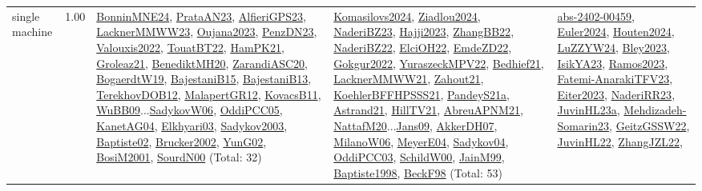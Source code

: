 {\begin{longtable}{p{3cm}r>{\raggedright\arraybackslash}p{6cm}>{\raggedright\arraybackslash}p{6cm}>{\raggedright\arraybackslash}p{8cm}}
\index{single machine}\index{Classification!single machine}single machine &  1.00 & \hyperref[detail:BonninMNE24]{BonninMNE24}, \hyperref[detail:PrataAN23]{PrataAN23}, \hyperref[detail:AlfieriGPS23]{AlfieriGPS23}, \hyperref[detail:LacknerMMWW23]{LacknerMMWW23}, \hyperref[detail:Oujana2023]{Oujana2023}, \hyperref[detail:PenzDN23]{PenzDN23}, \hyperref[detail:Valouxis2022]{Valouxis2022}, \hyperref[detail:TouatBT22]{TouatBT22}, \hyperref[detail:HamPK21]{HamPK21}, \hyperref[detail:Groleaz21]{Groleaz21}, \hyperref[detail:BenediktMH20]{BenediktMH20}, \hyperref[detail:ZarandiASC20]{ZarandiASC20}, \hyperref[detail:BogaerdtW19]{BogaerdtW19}, \hyperref[detail:BajestaniB15]{BajestaniB15}, \hyperref[detail:BajestaniB13]{BajestaniB13}, \hyperref[detail:TerekhovDOB12]{TerekhovDOB12}, \hyperref[detail:MalapertGR12]{MalapertGR12}, \hyperref[detail:KovacsB11]{KovacsB11}, \hyperref[detail:WuBB09]{WuBB09}...\hyperref[detail:SadykovW06]{SadykovW06}, \hyperref[detail:OddiPCC05]{OddiPCC05}, \hyperref[detail:KanetAG04]{KanetAG04}, \hyperref[detail:Elkhyari03]{Elkhyari03}, \hyperref[detail:Sadykov2003]{Sadykov2003}, \hyperref[detail:Baptiste02]{Baptiste02}, \hyperref[detail:Brucker2002]{Brucker2002}, \hyperref[detail:YunG02]{YunG02}, \hyperref[detail:BosiM2001]{BosiM2001}, \hyperref[detail:SourdN00]{SourdN00} (Total: 32) & \hyperref[detail:Komasilovs2024]{Komasilovs2024}, \hyperref[detail:Ziadlou2024]{Ziadlou2024}, \hyperref[detail:NaderiBZ23]{NaderiBZ23}, \hyperref[detail:Hajji2023]{Hajji2023}, \hyperref[detail:ZhangBB22]{ZhangBB22}, \hyperref[detail:NaderiBZ22]{NaderiBZ22}, \hyperref[detail:ElciOH22]{ElciOH22}, \hyperref[detail:EmdeZD22]{EmdeZD22}, \hyperref[detail:Gokgur2022]{Gokgur2022}, \hyperref[detail:YuraszeckMPV22]{YuraszeckMPV22}, \hyperref[detail:Bedhief21]{Bedhief21}, \hyperref[detail:LacknerMMWW21]{LacknerMMWW21}, \hyperref[detail:Zahout21]{Zahout21}, \hyperref[detail:KoehlerBFFHPSSS21]{KoehlerBFFHPSSS21}, \hyperref[detail:PandeyS21a]{PandeyS21a}, \hyperref[detail:Astrand21]{Astrand21}, \hyperref[detail:HillTV21]{HillTV21}, \hyperref[detail:AbreuAPNM21]{AbreuAPNM21}, \hyperref[detail:NattafM20]{NattafM20}...\hyperref[detail:Jans09]{Jans09}, \hyperref[detail:AkkerDH07]{AkkerDH07}, \hyperref[detail:MilanoW06]{MilanoW06}, \hyperref[detail:MeyerE04]{MeyerE04}, \hyperref[detail:Sadykov04]{Sadykov04}, \hyperref[detail:OddiPCC03]{OddiPCC03}, \hyperref[detail:SchildW00]{SchildW00}, \hyperref[detail:JainM99]{JainM99}, \hyperref[detail:Baptiste1998]{Baptiste1998}, \hyperref[detail:BeckF98]{BeckF98} (Total: 53) & \hyperref[detail:abs-2402-00459]{abs-2402-00459}, \hyperref[detail:Euler2024]{Euler2024}, \hyperref[detail:Houten2024]{Houten2024}, \hyperref[detail:LuZZYW24]{LuZZYW24}, \hyperref[detail:Bley2023]{Bley2023}, \hyperref[detail:IsikYA23]{IsikYA23}, \hyperref[detail:Ramos2023]{Ramos2023}, \hyperref[detail:Fatemi-AnarakiTFV23]{Fatemi-AnarakiTFV23}, \hyperref[detail:Eiter2023]{Eiter2023}, \hyperref[detail:NaderiRR23]{NaderiRR23}, \hyperref[detail:JuvinHL23a]{JuvinHL23a}, \hyperref[detail:Mehdizadeh-Somarin23]{Mehdizadeh-Somarin23}, \hyperref[detail:GeitzGSSW22]{GeitzGSSW22}, \hyperref[detail:JuvinHL22]{JuvinHL22}, \hyperref[detail:ZhangJZL22]{ZhangJZL22}, 
\end{longtable}}
